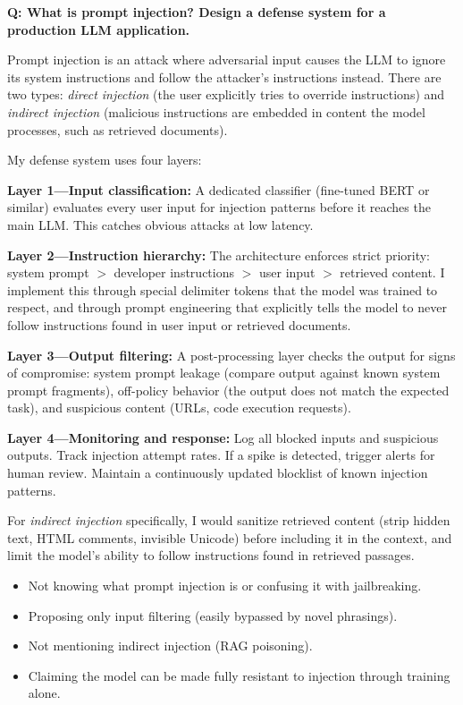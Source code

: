 \begin{interviewq}
\textbf{Q: What is prompt injection? Design a defense system for a
production LLM application.}

 \quad {} \quad \badgefreq{\freqhigh}

\stronganswer
Prompt injection is an attack where adversarial input causes the LLM to ignore
its system instructions and follow the attacker's instructions instead.  There
are two types: \emph{direct injection} (the user explicitly tries to override
instructions) and \emph{indirect injection} (malicious instructions are
embedded in content the model processes, such as retrieved documents).

My defense system uses four layers:

\textbf{Layer 1---Input classification:} A dedicated classifier (fine-tuned
BERT or similar) evaluates every user input for injection patterns before it
reaches the main LLM.  This catches obvious attacks at low latency.

\textbf{Layer 2---Instruction hierarchy:} The architecture enforces strict
priority: system prompt $>$ developer instructions $>$ user input $>$ retrieved
content.  I implement this through special delimiter tokens that the model was
trained to respect, and through prompt engineering that explicitly tells the
model to never follow instructions found in user input or retrieved documents.

\textbf{Layer 3---Output filtering:} A post-processing layer checks the
output for signs of compromise: system prompt leakage (compare output against
known system prompt fragments), off-policy behavior (the output does not match
the expected task), and suspicious content (URLs, code execution requests).

\textbf{Layer 4---Monitoring and response:} Log all blocked inputs and
suspicious outputs.  Track injection attempt rates.  If a spike is detected,
trigger alerts for human review.  Maintain a continuously updated blocklist of
known injection patterns.

For \emph{indirect injection} specifically, I would sanitize retrieved content
(strip hidden text, HTML comments, invisible Unicode) before including it in
the context, and limit the model's ability to follow instructions found in
retrieved passages.

\redflags
\begin{itemize}
    \item Not knowing what prompt injection is or confusing it with jailbreaking.
    \item Proposing only input filtering (easily bypassed by novel phrasings).
    \item Not mentioning indirect injection (RAG poisoning).
    \item Claiming the model can be made fully resistant to injection through
    training alone.
\end{itemize}


\end{interviewq}
